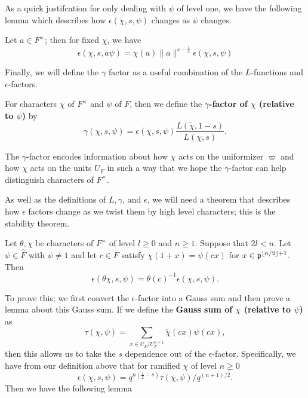 As a quick justifcation for only dealing with $\psi$ of level one, we have the following lemma which describes how $\epsilon(\chi, s, \psi)$ changes as $\psi$ changes.

\begin{lemma}\label{lem:level-one-psi-reduction}
  Let $a \in F^\times$; then for fixed $\chi$, we have
  \[\epsilon ( \chi, s, a \psi) = \chi(a) \| a \|^{s - \frac{1}{2}} \epsilon (\chi, s, \psi)\]
\end{lemma}

Finally, we will define the $\gamma$ factor as a useful combination of the $L$-functions and $\epsilon$-factors.
\begin{defn}
  For characters $\chi$ of $F^\times$ and $\psi$ of $F$, then we define the \textbf{$\gamma$-factor of $\chi$ (relative to $\psi$)} by
  \[\gamma(\chi, s, \psi) = \epsilon(\chi, s, \psi) \frac{L(\check{\chi}, 1-s)}{L(\chi,s)}.\]
\end{defn}
The $\gamma$-factor encodes information about how $\chi$ acts on the uniformizer $\varpi$ and how $\chi$ acts on the units $U_F$ in such a way that we hope the $\gamma$-factor can help distinguish characters of $F^\times$.


As well as the definitions of $L, \gamma$, and $\epsilon$, we will need a theorem that describes how $\epsilon$ factors change as we twist them by high level characters; this is the stability theorem.

\begin{theorem}
  \label{thm:Stability}
  Let $\theta, \chi$ be characters of $F^\times$ of level $ l \geq 0$ and $n \geq 1$.
  Suppose that $2l < n$.
  Let $\psi \in \hat{F}$ with $\psi \neq 1$ and let $c \in F$ satisfy $\chi(1+x) = \psi(cx)$ for $x \in \mathfrak{p}^{\lfloor n/2 \rfloor + 1}$.
  Then
  \[ \epsilon(\theta \chi, s, \psi) = \theta(c)^{-1} \epsilon(\chi, s, \psi).\]
\end{theorem}

To prove this; we first convert the $\epsilon$-factor into a Gauss sum and then prove a lemma about this Gauss sum.
If we define the \textbf{Gauss sum of $\chi$ (relative to $\psi$)} as
\[\tau(\chi, \psi) = \sum_{x \in U_F/U_F^{n+1}} \check{\chi}(cx) \psi(cx),\]
then this allows us to take the $s$ dependence out of the $\epsilon$-factor.
Specifically, we have from our definition above that for ramified $\chi$ of level $n \geq 0$
\[\epsilon(\chi, s, \psi) = q^{n(\frac{1}{2} - s)} \tau(\chi, \psi)/ q^{(n+1)/2}.\]
Then we have the following lemma

